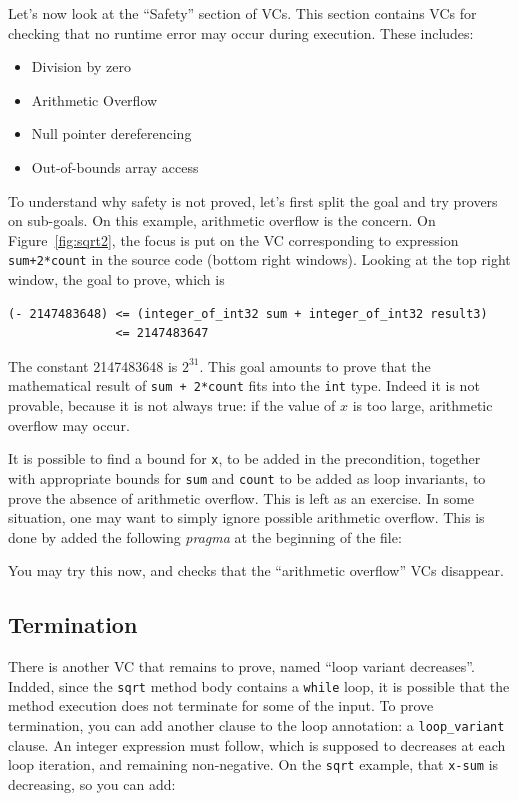 \documentclass[a4paper,11pt,twoside,openright]{report}
\begin{document}
Let's now look at the ``Safety'' section of VCs. This section contains
VCs for checking that no runtime error may occur during
execution. These includes:
\begin{itemize}
\item Division by zero
\item Arithmetic Overflow
\item Null pointer dereferencing
\item Out-of-bounds array access
\end{itemize}

To understand why safety is not proved, let's first split the goal and
try provers on sub-goals. On this example, arithmetic overflow is the
concern. On Figure~\ref{fig:sqrt2}, the focus is put on the VC
corresponding to expression \texttt{sum+2*count} in the source code
(bottom right windows). Looking at the top right window, the goal to prove, which is
\begin{verbatim}
(- 2147483648) <= (integer_of_int32 sum + integer_of_int32 result3)
               <= 2147483647
\end{verbatim}
The constant 2147483648 is $2^{31}$. This goal
amounts to prove that the mathematical result of \texttt{sum + 2*count} fits
into the \texttt{int} type. Indeed it is not
provable, because it is not always true: if the value of $x$ is too
large, arithmetic overflow may occur.

It is possible to find a bound for \texttt{x}, to be added in the
precondition, together with appropriate bounds for \texttt{sum} and
\texttt{count} to be added as loop invariants, to prove the absence of
arithmetic overflow. This is left as an exercise. In some situation,
one may want to simply ignore possible arithmetic overflow. This is
done by added the following \emph{pragma} at the beginning of the
file:


You may try this now, and checks that the ``arithmetic overflow'' VCs disappear.

\subsection*{Termination}

There is another VC that remains to prove, named ``loop variant
decreases''. Indded, since the \texttt{sqrt} method body contains a
\texttt{while} loop, it is possible that the method execution does not
terminate for some of the input. To prove termination, you can add
another clause to the loop annotation: a \texttt{loop\_variant}
clause. An integer expression must follow, which is supposed to
decreases at each loop iteration, and remaining non-negative. On the
\texttt{sqrt} example, that \texttt{x-sum} is decreasing, so you can
add: 
\end{document}
